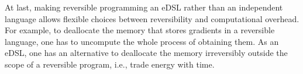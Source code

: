 \documentclass[aps,twocolumn,longbibliography,english,superscriptaddress]{revtex4-1}
\newcommand{\<}{\langle}
\renewcommand{\>}{\rangle}
\theoremstyle{definition}\newtheorem{definition}{\textit{Definition}}
\begin{document}
At last, making reversible programming an eDSL rather than an independent language allows flexible choices between reversibility and computational overhead. For example, to deallocate the memory that stores gradients in a reversible language, one has to uncompute the whole process of obtaining them.
As an eDSL, one has an alternative to deallocate the memory irreversibly outside the scope of a reversible program, i.e., trade energy with time.


\end{document}
